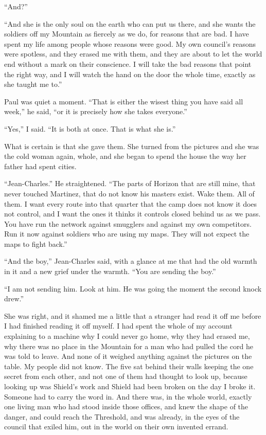 ``And?''\par

``And she is the only soul on the earth who can put us there, and she wants the soldiers off my Mountain as fiercely as we do, for reasons that are bad. I have spent my life among people whose reasons were good. My own council's reasons were spotless, and they erased me with them, and they are about to let the world end without a mark on their conscience. I will take the bad reasons that point the right way, and I will watch the hand on the door the whole time, exactly as she taught me to.''\par

Paul was quiet a moment. ``That is either the wisest thing you have said all week,'' he said, ``or it is precisely how she takes everyone.''\par

``Yes,'' I said. ``It is both at once. That is what she is.''\par

What is certain is that she gave them. She turned from the pictures and she was the cold woman again, whole, and she began to spend the house the way her father had spent cities.\par

``Jean-Charles.'' He straightened. ``The parts of Horizon that are still mine, that never touched Martinez, that do not know his masters exist. Wake them. All of them. I want every route into that quarter that the camp does not know it does not control, and I want the ones it thinks it controls closed behind us as we pass. You have run the network against smugglers and against my own competitors. Run it now against soldiers who are using my maps. They will not expect the maps to fight back.''\par

``And the boy,'' Jean-Charles said, with a glance at me that had the old warmth in it and a new grief under the warmth. ``You are sending the boy.''\par

``I am not sending him. Look at him. He was going the moment the second knock drew.''\par

She was right, and it shamed me a little that a stranger had read it off me before I had finished reading it off myself. I had spent the whole of my account explaining to a machine why I could never go home, why they had erased me, why there was no place in the Mountain for a man who had pulled the cord he was told to leave. And none of it weighed anything against the pictures on the table. My people did not know. The five sat behind their walls keeping the one secret from each other, and not one of them had thought to look up, because looking up was Shield's work and Shield had been broken on the day I broke it. Someone had to carry the word in. And there was, in the whole world, exactly one living man who had stood inside those offices, and knew the shape of the danger, and could reach the Threshold, and was already, in the eyes of the council that exiled him, out in the world on their own invented errand.\par

